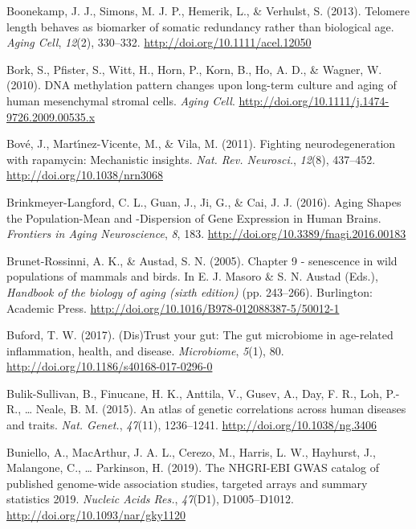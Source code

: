 \documentclass[12pt,twoside]{unicam}
\begin{document}
\begin{cslreferences}
\leavevmode\hypertarget{ref-Boonekamp2013}{}%
Boonekamp, J. J., Simons, M. J. P., Hemerik, L., \& Verhulst, S. (2013). Telomere length behaves as biomarker of somatic redundancy rather than biological age. \emph{Aging Cell}, \emph{12}(2), 330--332. \url{http://doi.org/10.1111/acel.12050}

\leavevmode\hypertarget{ref-Bork2010}{}%
Bork, S., Pfister, S., Witt, H., Horn, P., Korn, B., Ho, A. D., \& Wagner, W. (2010). DNA methylation pattern changes upon long-term culture and aging of human mesenchymal stromal cells. \emph{Aging Cell}. \url{http://doi.org/10.1111/j.1474-9726.2009.00535.x}

\leavevmode\hypertarget{ref-Bove2011}{}%
Bové, J., Martı́nez-Vicente, M., \& Vila, M. (2011). Fighting neurodegeneration with rapamycin: Mechanistic insights. \emph{Nat. Rev. Neurosci.}, \emph{12}(8), 437--452. \url{http://doi.org/10.1038/nrn3068}

\leavevmode\hypertarget{ref-Brinkmeyer-Langford2016}{}%
Brinkmeyer-Langford, C. L., Guan, J., Ji, G., \& Cai, J. J. (2016). Aging Shapes the Population-Mean and -Dispersion of Gene Expression in Human Brains. \emph{Frontiers in Aging Neuroscience}, \emph{8}, 183. \url{http://doi.org/10.3389/fnagi.2016.00183}

\leavevmode\hypertarget{ref-Brunet-Rossinni2005}{}%
Brunet-Rossinni, A. K., \& Austad, S. N. (2005). Chapter 9 - senescence in wild populations of mammals and birds. In E. J. Masoro \& S. N. Austad (Eds.), \emph{Handbook of the biology of aging (sixth edition)} (pp. 243--266). Burlington: Academic Press. \url{http://doi.org/10.1016/B978-012088387-5/50012-1}

\leavevmode\hypertarget{ref-Buford2017}{}%
Buford, T. W. (2017). (Dis)Trust your gut: The gut microbiome in age-related inflammation, health, and disease. \emph{Microbiome}, \emph{5}(1), 80. \url{http://doi.org/10.1186/s40168-017-0296-0}

\leavevmode\hypertarget{ref-Bulik-Sullivan2015}{}%
Bulik-Sullivan, B., Finucane, H. K., Anttila, V., Gusev, A., Day, F. R., Loh, P.-R., \ldots{} Neale, B. M. (2015). An atlas of genetic correlations across human diseases and traits. \emph{Nat. Genet.}, \emph{47}(11), 1236--1241. \url{http://doi.org/10.1038/ng.3406}

\leavevmode\hypertarget{ref-Buniello2019}{}%
Buniello, A., MacArthur, J. A. L., Cerezo, M., Harris, L. W., Hayhurst, J., Malangone, C., \ldots{} Parkinson, H. (2019). The NHGRI-EBI GWAS catalog of published genome-wide association studies, targeted arrays and summary statistics 2019. \emph{Nucleic Acids Res.}, \emph{47}(D1), D1005--D1012. \url{http://doi.org/10.1093/nar/gky1120}


\end{cslreferences}
\end{document}
